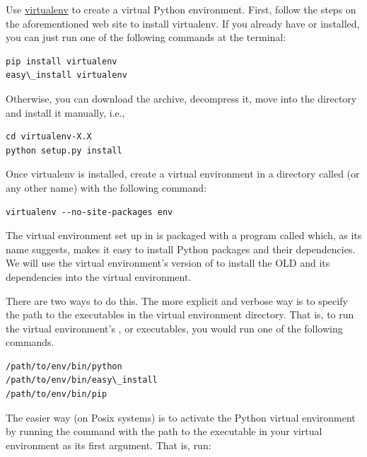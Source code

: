 \documentclass[letterpaper,10pt,english]{sphinxmanual}
\begin{document}
Use \href{http://www.virtualenv.org}{virtualenv} to create a virtual Python
environment.  First, follow the steps on the aforementioned web site to
install virtualenv.  If you already have  or  installed,
you can just run one of the following commands at the terminal:

\begin{Verbatim}[commandchars=\\\{\}]
pip install virtualenv
easy\_install virtualenv
\end{Verbatim}

Otherwise, you can download the  archive, decompress it, move into
the directory and install it manually, i.e.,

\begin{Verbatim}[commandchars=\\\{\}]
cd virtualenv-X.X
python setup.py install
\end{Verbatim}

Once virtualenv is installed, create a virtual environment in a directory called
 (or any other name) with the following command:

\begin{Verbatim}[commandchars=\\\{\}]
virtualenv --no-site-packages env
\end{Verbatim}

The virtual environment set up in  is packaged with a program called
 which, as its name suggests, makes it easy to install Python
packages and their dependencies.  We will use the virtual environment's version
of  to install the OLD and its dependencies into the virtual
environment.

There are two ways to do this.  The more explicit and verbose way is to specify
the path to the executables in the virtual environment directory.  That is, to
run the virtual environment's ,  or 
executables, you would run one of the following commands.

\begin{Verbatim}[commandchars=\\\{\}]
/path/to/env/bin/python
/path/to/env/bin/easy\_install
/path/to/env/bin/pip
\end{Verbatim}

The easier way (on Posix systems) is to activate the Python virtual environment
by running the  command with the path to the  executable
in your virtual environment as its first argument.  That is, run:
\end{document}
